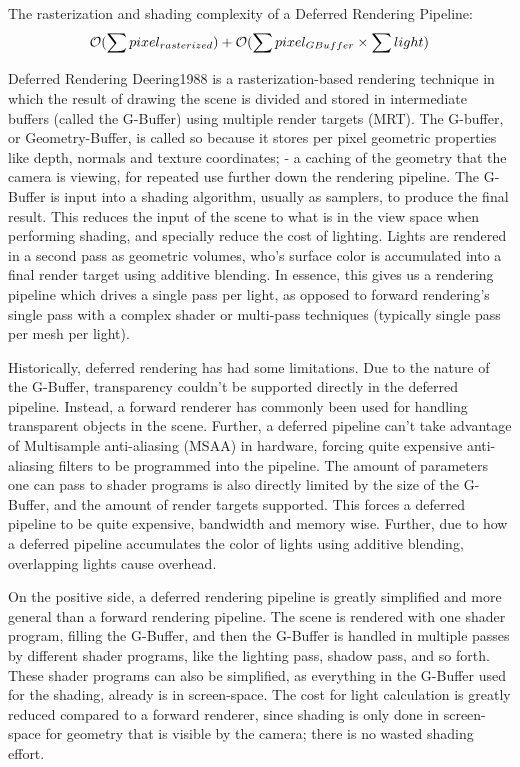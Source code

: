 The rasterization and shading complexity of a Deferred Rendering Pipeline:
\begin{equation}\label{fig:DRP_complexity}
		\mathcal{O}(\sum {pixel_{rasterized}}) + \mathcal{O}(\sum {pixel_{GBuffer}} \times \sum {light})
\end{equation}

Deferred Rendering Deering1988 is a rasterization-based rendering technique in which the result of drawing the scene is divided and stored in intermediate buffers (called the G-Buffer) using multiple render targets (MRT).  The G-buffer, or Geometry-Buffer, is called so because it stores per pixel geometric properties like depth, normals and texture coordinates; - a caching of the geometry that the camera is viewing, for repeated use further down the rendering pipeline. The G-Buffer is input into a shading algorithm, usually as samplers, to produce the final result. This reduces the input of the scene to what is in the view space when performing shading, and specially reduce the cost of lighting. Lights are rendered in a second pass as geometric volumes, who's surface color is accumulated into a final render target using additive blending. In essence, this gives us a rendering pipeline which drives a single pass per light, as opposed to forward rendering's single pass with a complex shader or multi-pass techniques (typically single pass per mesh per light).

Historically, deferred rendering has had some limitations. Due to the nature of the G-Buffer, transparency couldn't be supported directly in the deferred pipeline. Instead, a forward renderer has commonly been used for handling transparent objects in the scene. Further, a deferred pipeline can't take advantage of Multisample anti-aliasing (MSAA) in hardware, forcing quite expensive anti-aliasing filters to be programmed into the pipeline. The amount of parameters one can pass to shader programs is also directly limited by the size of the G-Buffer, and the amount of render targets supported. This forces a deferred pipeline to be quite expensive, bandwidth and memory wise. Further, due to how a deferred pipeline accumulates the color of lights using additive blending, overlapping lights cause overhead.

On the positive side, a deferred rendering pipeline is greatly simplified and more general than a forward rendering pipeline. The scene is rendered with one shader program, filling the G-Buffer, and then the G-Buffer is handled in multiple passes by different shader programs, like the lighting pass, shadow pass, and so forth. These shader programs can also be simplified, as everything in the G-Buffer used for the shading, already is in screen-space. The cost for light calculation is greatly reduced compared to a forward renderer, since shading is only done in screen-space for geometry that is visible by the camera; there is no wasted shading effort.

